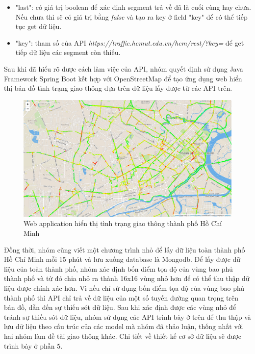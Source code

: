 \begin{itemize}
\begin{itemize}
    \item "last": có giá trị boolean để xác định segment trả về đã là cuối cùng hay chưa. Nếu chưa thì sẽ có giá trị bằng \textit{false} và tạo ra key ở field "key" để có thể tiếp tục get dữ liệu.
    \item "key": tham số của API \textit{https://traffic.hcmut.edu.vn/hcm/rest/?key=} để get tiếp dữ liệu các segment còn thiếu.
    \end{itemize}
\end{itemize}
Sau khi đã hiểu rõ được cách làm việc của API, nhóm quyết định sử dụng Java Framework Spring Boot kết hợp với OpenStreetMap để tạo ứng dụng web hiển thị bản đồ tình trạng giao thông dựa trên dữ liệu lấy được từ các API trên.

\begin{figure}[!ht]
	\begin{center}
		\includegraphics[width=1.0\textwidth]{Traffic_Report/images/map.png}
	\end{center}
	\caption{Web application hiển thị tình trạng giao thông thành phố Hồ Chí Minh}
\end{figure}

Đồng thời, nhóm cũng viết một chương trình nhỏ để lấy dữ liệu toàn thành phố Hồ Chí Minh mỗi 15 phút và lưu xuống database là Mongodb. Để lấy được dữ liệu của toàn thành phố, nhóm xác định bốn điểm tọa độ của vùng bao phủ thành phố và từ đó chia nhỏ ra thành 16x16 vùng nhỏ hơn để có thể thu thập dữ liệu được chính xác hơn. Vì nếu chỉ sử dụng bốn điểm tọa độ của vùng bao phủ thành phố thì API chỉ trả về dữ liệu của một số tuyến đường quan trọng trên bản đồ, dẫn đến sự thiếu sót dữ liệu. Sau khi xác định được các vùng nhỏ để tránh sự thiếu sót dữ liệu, nhóm sử dụng các API trình bày ở trên để thu thập và lưu dữ liệu theo cấu trúc của các model mà nhóm đã thảo luận, thống nhất với hai nhóm làm đề tài giao thông khác. Chi tiết về thiết kế cơ sở dữ liệu sẽ được trình bày ở phần 5.


